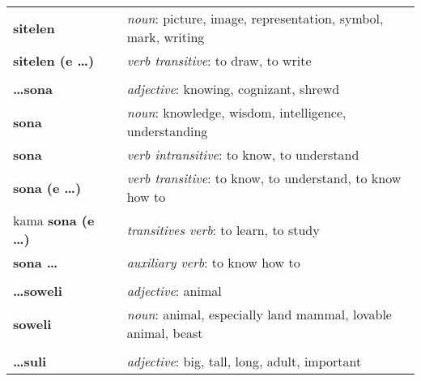\begin{supertabular}{p{2,5cm}|ll}
    \textbf{sitelen}             &  & \textit{noun}: picture, image, representation, symbol, mark, writing                                       \\
    \textbf{sitelen (e \dots)}   &  & \textit{verb transitive}: to draw, to write                                                                \\
                                 &  &                                                                                                            \\ %
    \textbf{\dots sona}          &  & \textit{adjective}: knowing, cognizant, shrewd                                                             \\
    \textbf{sona}                &  & \textit{noun}: knowledge, wisdom, intelligence, understanding                                              \\
    \textbf{sona}                &  & \textit{verb intransitive}: to know, to understand                                                         \\
    \textbf{sona (e \dots)}      &  & \textit{verb transitive}: to know, to understand, to know how to                                           \\
    kama \textbf{sona (e \dots)} &  & \textit{transitives verb}: to learn, to study                                                              \\
    \textbf{sona \dots}          &  & \textit{auxiliary verb}: to know how to                                                                    \\
                                 &  &                                                                                                            \\ %
    \textbf{\dots soweli}        &  & \textit{adjective}: animal                                                                                 \\
    \textbf{soweli}              &  & \textit{noun}: animal, especially land mammal, lovable animal, beast                                       \\
                                 &  &                                                                                                            \\ %
    \textbf{\dots suli}          &  & \textit{adjective}: big, tall, long, adult, important                                                      \\

\end{supertabular}
